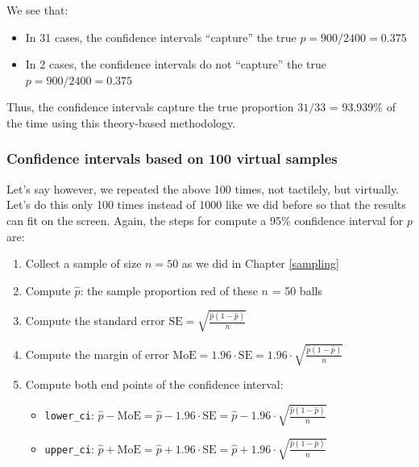 \documentclass[12pt, krantz2,]{krantz}
\providecommand{\tightlist}{%
  \setlength{\itemsep}{0pt}\setlength{\parskip}{0pt}}
\begin{document}
We see that:

\begin{itemize}
\tightlist
\item
  In 31 cases, the confidence intervals ``capture'' the true \(p = 900 / 2400 = 0.375\)
\item
  In 2 cases, the confidence intervals do not ``capture'' the true \(p = 900 / 2400 = 0.375\)
\end{itemize}

Thus, the confidence intervals capture the true proportion \(31 / 33\) = 93.939\% of the time using this theory-based methodology.

\hypertarget{confidence-intervals-based-on-100-virtual-samples}{%
\subsubsection*{Confidence intervals based on 100 virtual samples}\label{confidence-intervals-based-on-100-virtual-samples}}


Let's say however, we repeated the above 100 times, not tactilely, but virtually. Let's do this only 100 times instead of 1000 like we did before so that the results can fit on the screen. Again, the steps for compute a 95\% confidence interval for \(p\) are:

\begin{enumerate}
\def\labelenumi{\arabic{enumi}.}
\tightlist
\item
  Collect a sample of size \(n = 50\) as we did in Chapter \ref{sampling}
\item
  Compute \(\widehat{p}\): the sample proportion red of these \(n\) = 50 balls
\item
  Compute the standard error \(\text{SE} = \sqrt{\frac{\widehat{p}(1-\widehat{p})}{n}}\)
\item
  Compute the margin of error \(\text{MoE} = 1.96 \cdot \text{SE} = 1.96 \cdot \sqrt{\frac{\widehat{p}(1-\widehat{p})}{n}}\)
\item
  Compute both end points of the confidence interval:

  \begin{itemize}
  \tightlist
  \item
    \texttt{lower\_ci}: \(\widehat{p} - \text{MoE} = \widehat{p} - 1.96 \cdot \text{SE} = \widehat{p} - 1.96 \cdot \sqrt{\frac{\widehat{p}(1-\widehat{p})}{n}}\)
  \item
    \texttt{upper\_ci}: \(\widehat{p} + \text{MoE} = \widehat{p} + 1.96 \cdot \text{SE} = \widehat{p} +1.96 \cdot \sqrt{\frac{\widehat{p}(1-\widehat{p})}{n}}\)
  \end{itemize}
\end{enumerate}
\end{document}

